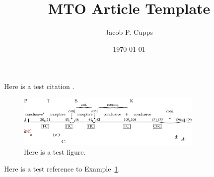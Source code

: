 \documentclass[12pt]{article}
\title{MTO Article Template}
\author{Jacob P. Cupps}
\date{\today}
\renewcommand{\maketitle}{
    \begin{center}
    \huge \thetitle
    
    \small \thedate
    \end{center}
    }
\begin{document}
\renewcommand*{\notesname}{Footnotes}
\renewcommand*{\figurename}{Example}

\maketitle

\lipsum[1-3]
    
\lipsum[4-5] Here is a test citation \autocite{ahrens2017}.

\newpage
    \begin{figure}[t]
        \centering
        \includegraphics[width=0.8\textwidth]{figures/51_2_1_expo.pdf}
        \caption{Here is a test figure.}
        \label{fig:testfig}
    \end{figure}

\lipsum[6] Here is a test reference to Example~\ref{fig:testfig}.

\newpage
\printbibliography[title=Works Cited]
\nocite{*}

\newpage
\theendnotes
\end{document}
